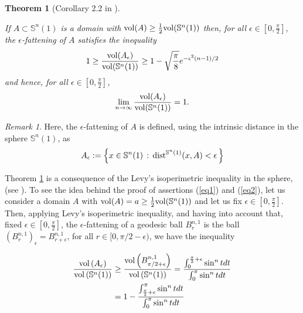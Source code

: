 \documentclass{amsart}
\newtheorem{theoremA}{Theorem}
\theoremstyle{definition}
\theoremstyle{remark}
\newtheorem{remark}[theorem]{Remark}
\newcommand{\ese}{\mathbb{S}}
\begin{document}
\begin{theoremA}[Corollary 2.2 in \cite{MS}]\label{measurecon}\

 If $A\subset \mathbb{S}^n(1)$ is a domain with ${\rm vol }(A)\geq \frac{1}{2} {\rm vol}(\mathbb{S}^n(1))$ then, for all $\epsilon \in [0,\frac{\pi}{2}]$, the  $\epsilon$-fattening of $A$ satisfies the inequality
\begin{equation}\label{eq1}
1 \geq \frac{{\rm vol}(A_\epsilon)}{{\rm vol}(\mathbb{S}^n(1))}\geq 1-\sqrt{\frac{\pi}{8}}e^{-\epsilon^2(n-1)/2}
\end{equation}
\noindent and hence, for all $\epsilon \in [0,\frac{\pi}{2}]$, 
\begin{equation}\label{eq2}
\lim_{n\to \infty} \frac{{\rm vol}(A_\epsilon)}{{\rm vol}(\mathbb{S}^n(1))}= 1.
\end{equation}
\end{theoremA}  
\begin{remark}
Here, the $\epsilon$-fattening of $A$ is defined, using the intrinsic distance in the sphere $\ese^n(1)$, as
$$A_\epsilon:=\left\{x\in \mathbb{S}^n(1)\, :\, {\rm dist}^{\mathbb{S}^n(1)}(x,A)<\epsilon\, \right\}
$$
 \end{remark}
  
 Theorem \ref{measurecon} is a consequence of the Levy's isoperimetric inequality in the sphere, (see \cite{MS}).
  To see the idea behind the proof of assertions (\ref{eq1}) and (\ref{eq2}), let us consider a  domain $A$ with ${\rm vol }(A)=a \geq \frac{1}{2} {\rm vol}(\mathbb{S}^n(1))$ and let us fix $\epsilon \in [0,\frac{\pi}{2}]$. Then,  applying Levy's isoperimetric inequality, and having into account that, fixed $\epsilon \in [0,\frac{\pi}{2}]$, the $\epsilon$-fattening of a geodesic ball $B^{n,1}_{r}$ is the ball $(B^{n,1}_{r})_{\epsilon}=B^{n,1}_{r+\epsilon}$, for all $r \in [0,\pi/2-\epsilon)$, we have the inequality
  
\begin{equation}
\begin{aligned}
\frac{{\rm vol}\left(A_\epsilon\right)}{{\rm vol}\left(\mathbb{S}^n(1)\right)}&\geq  \frac{{\rm vol}\left(B^{n,1}_{\pi/2+\epsilon}\right)}{{\rm vol}\left(\mathbb{S}^n(1)\right)}= \frac{\int _0^{\frac{\pi}{2}+\epsilon} \sin^n t dt }{\int _0^\pi \sin^n t dt }\\
&=1-\frac{\int_{\frac{\pi}{2}+\epsilon}^{\pi} \sin^n t dt }{\int _0^\pi \sin^n t dt }
\end{aligned}
\end{equation}
\end{document}
